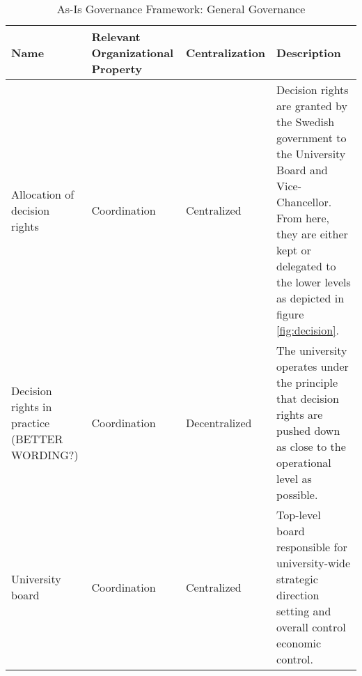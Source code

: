 \begin{table}[H]
\caption{As-Is Governance Framework: General Governance}
\label{table:as-isGeneralGovernance}
\begin{tabular}{ | p{} | p{}| p{} | p{}|}
%
\hline
%
\textbf{Name} & 
\textbf{Relevant Organizational Property} &
\textbf{Centralization} &  
\textbf{Description} \\
%
\hline
%
 Allocation of decision rights & 
 Coordination &
 Centralized & 
 Decision rights are granted by the Swedish government to the University Board and Vice-Chancellor. From here, they are either kept or delegated to the lower levels as depicted in figure \ref{fig:decision}. \\
%
\hline
%
 Decision rights in practice (BETTER WORDING?) & 
 Coordination &
 Decentralized & 
 The university operates under the principle that decision rights are pushed down as close to the operational level as possible. \\
%
\hline
%
%
%
 University board &
 Coordination &
 Centralized &
 Top-level board responsible for university-wide strategic direction setting and overall control economic control. \\
%
\hline
%
 

\end{tabular}
\end{table}
